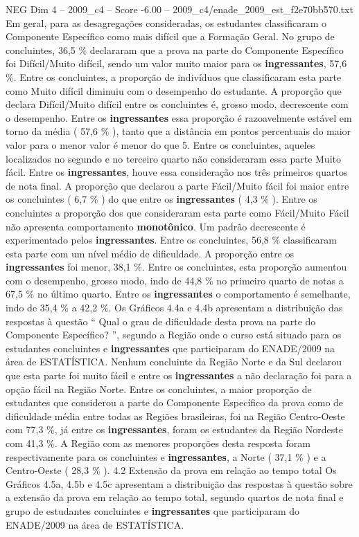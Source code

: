 \begin{textsample}{NEG Dim 4 – 2009\_c4 – Score -6.00 – 2009\_c4/enade\_2009\_est\_f2e70bb570.txt}
Em geral, para as desagregações consideradas, os estudantes classificaram o Componente Específico como mais difícil que a Formação Geral.
No grupo de concluintes, 36,5 \% declararam que a prova na parte do Componente Específico foi Difícil/Muito difícil, sendo um valor muito maior para os \textbf{ingressantes}, 57,6 \%.
Entre os concluintes, a proporção de indivíduos que classificaram esta parte como Muito difícil diminuiu com o desempenho do estudante.
A proporção que declara Difícil/Muito difícil entre os concluintes é, grosso modo, decrescente com o desempenho.
Entre os \textbf{ingressantes} essa proporção é razoavelmente estável em torno da média ( 57,6 \% ), tanto que a distância em pontos percentuais do maior valor para o menor valor é menor do que 5.
Entre os concluintes, aqueles localizados no segundo e no terceiro quarto não consideraram essa parte Muito fácil.
Entre os \textbf{ingressantes}, houve essa consideração nos três primeiros quartos de nota final.
A proporção que declarou a parte Fácil/Muito fácil foi maior entre os concluintes ( 6,7 \% ) do que entre os \textbf{ingressantes} ( 4,3 \% ).
Entre os concluintes a proporção dos que consideraram esta parte como Fácil/Muito Fácil não apresenta comportamento \textbf{monotônico}.
Um padrão decrescente é experimentado pelos \textbf{ingressantes}.
Entre os concluintes, 56,8 \% classificaram esta parte com um nível médio de dificuldade.
A proporção entre os \textbf{ingressantes} foi menor, 38,1 \%.
Entre os concluintes, esta proporção aumentou com o desempenho, grosso modo, indo de 44,8 \% no primeiro quarto de notas a 67,5 \% no último quarto.
Entre os \textbf{ingressantes} o comportamento é semelhante, indo de 35,4 \% a 42,2 \%.
Os Gráficos 4.4a e 4.4b apresentam a distribuição das respostas à questão “ Qual o grau de dificuldade desta prova na parte do Componente Específico? ”, segundo a Região onde o curso está situado para os estudantes concluintes e \textbf{ingressantes} que participaram do ENADE/2009 na área de ESTATÍSTICA.
Nenhum concluinte da Região Norte e da Sul declarou que esta parte foi muito fácil e entre os \textbf{ingressantes} a não declaração foi para a opção fácil na Região Norte.
Entre os concluintes, a maior proporção de estudantes que considerou a parte do Componente Específico da prova como de dificuldade média entre todas as Regiões brasileiras, foi na Região Centro-Oeste com 77,3 \%, já entre os \textbf{ingressantes}, foram os estudantes da Região Nordeste com 41,3 \%.
A Região com as menores proporções desta resposta foram respectivamente para os concluintes e \textbf{ingressantes}, a Norte ( 37,1 \% ) e a Centro-Oeste ( 28,3 \% ). 4.2 Extensão da prova em relação ao tempo total Os Gráficos 4.5a, 4.5b e 4.5c apresentam a distribuição das respostas à questão sobre a extensão da prova em relação ao tempo total, segundo quartos de nota final e grupo de estudantes concluintes e \textbf{ingressantes} que participaram do ENADE/2009 na área de ESTATÍSTICA.

\end{textsample}
